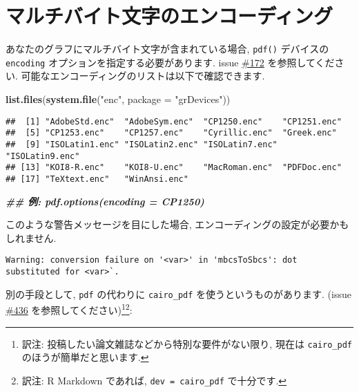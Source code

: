 \documentclass[
  lualatex,ja=standard,jafont=noto-otf]{bxjsreport}
\newenvironment{Shaded}{\begin{snugshade}}{\end{snugshade}}
\newcommand{\AttributeTok}[1]{\textcolor[rgb]{0.13,0.29,0.53}{#1}}
\newcommand{\DocumentationTok}[1]{\textcolor[rgb]{0.56,0.35,0.01}{\textbf{\textit{#1}}}}
\newcommand{\FunctionTok}[1]{\textcolor[rgb]{0.13,0.29,0.53}{\textbf{#1}}}
\newcommand{\NormalTok}[1]{#1}
\newcommand{\StringTok}[1]{\textcolor[rgb]{0.31,0.60,0.02}{#1}}
\begin{document}
\hypertarget{ux30deux30ebux30c1ux30d0ux30a4ux30c8ux6587ux5b57ux306eux30a8ux30f3ux30b3ux30fcux30c7ux30a3ux30f3ux30b0}{%
\section*{マルチバイト文字のエンコーディング}\label{ux30deux30ebux30c1ux30d0ux30a4ux30c8ux6587ux5b57ux306eux30a8ux30f3ux30b3ux30fcux30c7ux30a3ux30f3ux30b0}}

あなたのグラフにマルチバイト文字が含まれている場合, \texttt{pdf()}
デバイスの \texttt{encoding} オプションを指定する必要があります. issue
\href{https://github.com/yihui/knitr/issues/172}{\#172}
を参照してください. 可能なエンコーディングのリストは以下で確認できます.

\begin{Shaded}
\begin{Highlighting}[numbers=left,,]
\FunctionTok{list.files}\NormalTok{(}\FunctionTok{system.file}\NormalTok{(}\StringTok{"enc"}\NormalTok{, }\AttributeTok{package =} \StringTok{"grDevices"}\NormalTok{))}
\end{Highlighting}
\end{Shaded}

\begin{verbatim}
##  [1] "AdobeStd.enc"  "AdobeSym.enc"  "CP1250.enc"    "CP1251.enc"   
##  [5] "CP1253.enc"    "CP1257.enc"    "Cyrillic.enc"  "Greek.enc"    
##  [9] "ISOLatin1.enc" "ISOLatin2.enc" "ISOLatin7.enc" "ISOLatin9.enc"
## [13] "KOI8-R.enc"    "KOI8-U.enc"    "MacRoman.enc"  "PDFDoc.enc"   
## [17] "TeXtext.enc"   "WinAnsi.enc"
\end{verbatim}

\begin{Shaded}
\begin{Highlighting}[numbers=left,,]
\DocumentationTok{\#\# 例: pdf.options(encoding = \textquotesingle{}CP1250\textquotesingle{})}
\end{Highlighting}
\end{Shaded}

このような警告メッセージを目にした場合,
エンコーディングの設定が必要かもしれません.

\begin{verbatim}
Warning: conversion failure on '<var>' in 'mbcsToSbcs': dot substituted for <var>`.
\end{verbatim}

別の手段として, \texttt{pdf} の代わりに \texttt{cairo\_pdf}
を使うというものがあります. (issue
\href{https://github.com/yihui/knitr/issues/436}{\#436}
を参照してください)\footnote{訳注:
  投稿したい論文雑誌などから特別な要件がない限り, 現在は
  \texttt{cairo\_pdf} のほうが簡単だと思います.}\footnote{訳注: R
  Markdown であれば,
  \texttt{dev\ =\ \textquotesingle{}cairo\_pdf\textquotesingle{}}
  で十分です.}:
\end{document}
